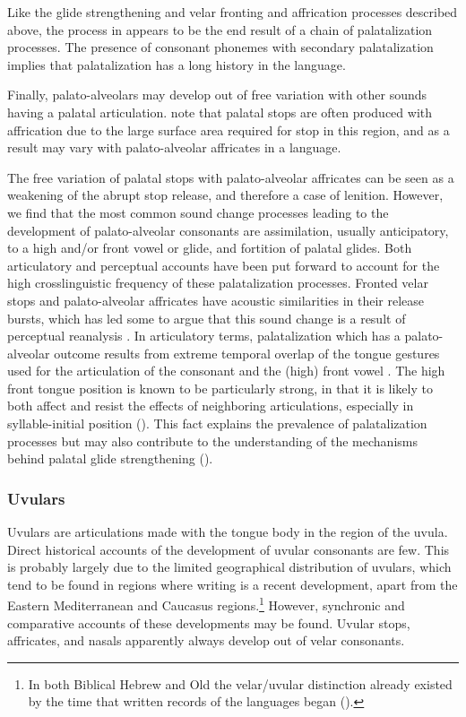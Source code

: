 Like the glide strengthening and velar fronting and affrication processes described above, the process in  appears to be the end result of a chain of palatalization processes. The presence of consonant phonemes with secondary palatalization implies that palatalization has a long history in the language.

  Finally, palato-alveolars may develop out of free variation with other sounds having a palatal articulation. \citet[31--33]{LadefogedMaddieson1996} note that palatal stops are often produced with affrication due to the large surface area required for stop in this region, and as a result may vary with palato-alveolar affricates in a language.

  The free variation of palatal stops with palato-alveolar affricates can be seen as a weakening of the abrupt stop release, and therefore a case of lenition. However, we find that the most common sound change processes leading to the development of palato-alveolar consonants are assimilation, usually anticipatory, to a high and/or front vowel or glide, and fortition of palatal glides. Both articulatory and perceptual accounts have been put forward to account for the high crosslinguistic frequency of these palatalization processes. Fronted velar stops and palato-alveolar affricates have acoustic similarities in their release bursts, which has led some to argue that this sound change is a result of perceptual reanalysis \citep{Guion1998}. In articulatory terms, palatalization which has a palato-alveolar outcome results from extreme temporal overlap of the tongue gestures used for the articulation of the consonant and the (high) front vowel \citep{Bateman2007}. The high front tongue position is known to be particularly strong, in that it is likely to both affect and resist the effects of neighboring articulations, especially in syllable-initial position (\citealt{RecasensEspinosa2009,Recasens2014}). This fact explains the prevalence of palatalization processes but may also contribute to the understanding of the mechanisms behind palatal glide strengthening (\citealt{BybeeEasterday2019}).

\subsubsection{{Uvulars}}\label{sec:4.5.2.2}

  Uvulars are articulations made with the tongue body in the region of the uvula. Direct historical accounts of the development of uvular consonants are few. This is probably largely due to the limited geographical distribution of uvulars, which tend to be found in regions where writing is a recent development, apart from the Eastern Mediterranean and Caucasus regions.\footnote{{In both Biblical Hebrew and Old  the velar/uvular distinction already existed by the time that written records of the languages began (\citealt{Rendsburg1997,Butskhrikidze2002}).}}  However, synchronic and comparative accounts of these developments may be found. Uvular stops, affricates, and nasals apparently always develop out of velar consonants.


